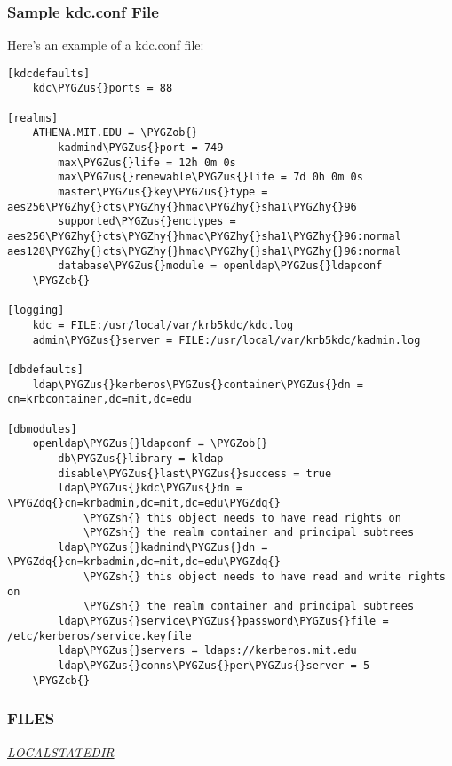 \documentclass[letterpaper,10pt,english]{sphinxmanual}
\def\PYGZus{\char`\_}
\def\PYGZob{\char`\{}
\def\PYGZcb{\char`\}}
\def\PYGZsh{\char`\#}
\def\PYGZhy{\char`\-}
\def\PYGZdq{\char`\"}
\begin{document}
\subsubsection{Sample kdc.conf File}
\label{admin/conf_files/kdc_conf:sample-kdc-conf-file}
Here's an example of a kdc.conf file:

\begin{Verbatim}[commandchars=\\\{\}]
[kdcdefaults]
    kdc\PYGZus{}ports = 88

[realms]
    ATHENA.MIT.EDU = \PYGZob{}
        kadmind\PYGZus{}port = 749
        max\PYGZus{}life = 12h 0m 0s
        max\PYGZus{}renewable\PYGZus{}life = 7d 0h 0m 0s
        master\PYGZus{}key\PYGZus{}type = aes256\PYGZhy{}cts\PYGZhy{}hmac\PYGZhy{}sha1\PYGZhy{}96
        supported\PYGZus{}enctypes = aes256\PYGZhy{}cts\PYGZhy{}hmac\PYGZhy{}sha1\PYGZhy{}96:normal aes128\PYGZhy{}cts\PYGZhy{}hmac\PYGZhy{}sha1\PYGZhy{}96:normal
        database\PYGZus{}module = openldap\PYGZus{}ldapconf
    \PYGZcb{}

[logging]
    kdc = FILE:/usr/local/var/krb5kdc/kdc.log
    admin\PYGZus{}server = FILE:/usr/local/var/krb5kdc/kadmin.log

[dbdefaults]
    ldap\PYGZus{}kerberos\PYGZus{}container\PYGZus{}dn = cn=krbcontainer,dc=mit,dc=edu

[dbmodules]
    openldap\PYGZus{}ldapconf = \PYGZob{}
        db\PYGZus{}library = kldap
        disable\PYGZus{}last\PYGZus{}success = true
        ldap\PYGZus{}kdc\PYGZus{}dn = \PYGZdq{}cn=krbadmin,dc=mit,dc=edu\PYGZdq{}
            \PYGZsh{} this object needs to have read rights on
            \PYGZsh{} the realm container and principal subtrees
        ldap\PYGZus{}kadmind\PYGZus{}dn = \PYGZdq{}cn=krbadmin,dc=mit,dc=edu\PYGZdq{}
            \PYGZsh{} this object needs to have read and write rights on
            \PYGZsh{} the realm container and principal subtrees
        ldap\PYGZus{}service\PYGZus{}password\PYGZus{}file = /etc/kerberos/service.keyfile
        ldap\PYGZus{}servers = ldaps://kerberos.mit.edu
        ldap\PYGZus{}conns\PYGZus{}per\PYGZus{}server = 5
    \PYGZcb{}
\end{Verbatim}


\subsubsection{FILES}
\label{admin/conf_files/kdc_conf:files}
{\hyperref[mitK5defaults:paths]{\emph{LOCALSTATEDIR}}}
\end{document}
